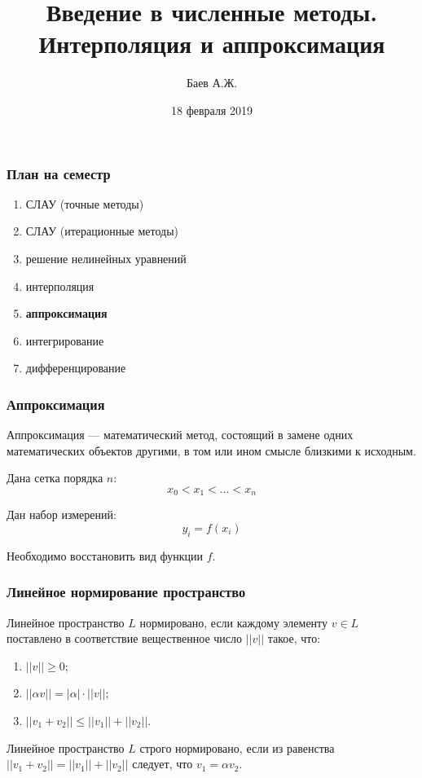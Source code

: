 \documentclass[10pt]{beamer}
\author{Баев А.Ж.}
\title{Введение в численные методы. \\ Интерполяция и аппроксимация}
\institute{Казахстанский филиал МГУ}
\date{18 февраля 2019}
\begin{document}
\maketitle


\begin{frame}[fragile]
\frametitle{План на семестр}

\begin{enumerate}
\item СЛАУ (точные методы)
\item СЛАУ (итерационные методы)
\item решение нелинейных уравнений
\item интерполяция
\item \textbf{аппроксимация}
\item интегрирование
\item дифференцирование
\end{enumerate}

\end{frame}


\begin{frame}[fragile]
\frametitle{Аппроксимация}

Аппроксимация --- математический метод, состоящий в замене одних математических объектов другими, в том или ином смысле близкими к исходным. 

\vfill
Дана сетка порядка $n$: 
$$x_0 < x_1 < \ldots < x_n$$

\vfill
Дан набор измерений:
$$y_i = f(x_i)$$

\vfill
Необходимо восстановить вид функции $f$.
\end{frame}


\begin{frame}[fragile]
\frametitle{Линейное нормирование пространство}

Линейное пространство $L$ нормировано, если каждому элементу $v \in L$ поставлено в соответствие вещественное число $||v||$ такое, что:
\begin{enumerate}
\item $||v|| \geqslant 0$;
\item $||\alpha v|| = |\alpha| \cdot ||v||$;
\item $||v_1 + v_2|| \leqslant ||v_1|| + ||v_2||$.
\end{enumerate}

\vfill
Линейное пространство $L$ строго нормировано, если из равенства $||v_1 + v_2|| = ||v_1|| + ||v_2||$ следует, что $v_1 = \alpha v_2$.
\end{frame}
\end{document}
